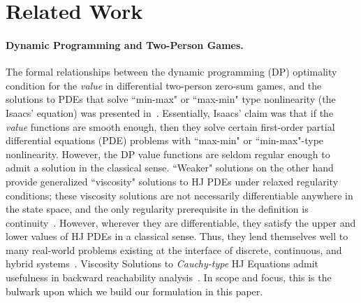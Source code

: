 \section{Related Work}

\paragraph{Dynamic Programming and Two-Person Games.}
The formal relationships between the dynamic programming (DP) optimality condition for the \textit{value} in differential two-person zero-sum games, and the solutions to PDEs that solve ``min-max" or ``max-min" type nonlinearity (the Isaacs' equation) was presented in~\cite{Isaacs1965}. 
Essentially, Isaacs' claim was that if the \textit{value} functions are smooth enough, then they solve certain first-order partial differential equations (PDE) problems with  ``max-min" or ``min-max"-type nonlinearity.  
However, the DP value functions are seldom regular enough to admit a solution in the classical sense.  
``Weaker" solutions on the other hand~\cite{Lions1982, Evans1984, Crandall1984, CrandallLaxFriedrichs, Souganidis} provide generalized ``viscosity" solutions to HJ PDEs under relaxed regularity conditions; these viscosity solutions are not necessarily differentiable anywhere in the state space, and the only regularity prerequisite in the definition is continuity~\cite{Crandall1983viscosity}. 
However, wherever they are differentiable, they satisfy the  upper and lower values of HJ PDEs in a classical sense. 
Thus, they lend themselves well to many real-world problems existing at the interface of discrete, continuous, and hybrid systems~\cite{LygerosReachability, OsherFronts, Mitchell2020, Souganidis, Mitchell2005}. 
Viscosity Solutions to \textit{Cauchy-type} HJ Equations admit usefulness in backward reachability analysis~\cite{Mitchell2005}. 
In scope and focus, this is the bulwark upon which we build our formulation in this paper.


